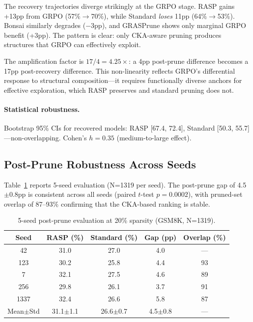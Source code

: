 \documentclass[11pt,a4paper]{article}
\newcommand{\method}{RASP}
\begin{document}
The recovery trajectories diverge strikingly at the GRPO stage. \method{} gains +13pp from GRPO (57\%$\to$70\%), while Standard \emph{loses} 11pp (64\%$\to$53\%). Bonsai similarly degrades ($-$3pp), and GRASPrune shows only marginal GRPO benefit (+3pp). The pattern is clear: only CKA-aware pruning produces structures that GRPO can effectively exploit.

The amplification factor is $17/4 = 4.25\times$: a 4pp post-prune difference becomes a 17pp post-recovery difference. This non-linearity reflects GRPO's differential response to structural composition---it requires functionally diverse anchors for effective exploration, which \method{} preserves and standard pruning does not.

\paragraph{Statistical robustness.} Bootstrap 95\% CIs for recovered models: \method{} [67.4, 72.4], Standard [50.3, 55.7]---non-overlapping. Cohen's $h = 0.35$ (medium-to-large effect).

\subsection{Post-Prune Robustness Across Seeds}
\label{sec:seeds}

Table~\ref{tab:seeds} reports 5-seed evaluation (N=1319 per seed). The post-prune gap of 4.5$\pm$0.8pp is consistent across all seeds (paired $t$-test $p = 0.0002$), with pruned-set overlap of 87--93\% confirming that the CKA-based ranking is stable.

\begin{table}[t]
\centering
\small
\caption{5-seed post-prune evaluation at 20\% sparsity (GSM8K, N=1319).}
\label{tab:seeds}
\begin{tabular}{ccccc}
\toprule
\textbf{Seed} & \textbf{\method{} (\%)} & \textbf{Standard (\%)} & \textbf{Gap (pp)} & \textbf{Overlap (\%)} \\
\midrule
42 & 31.0 & 27.0 & 4.0 & --- \\
123 & 30.2 & 25.8 & 4.4 & 93 \\
7 & 32.1 & 27.5 & 4.6 & 89 \\
256 & 29.8 & 26.1 & 3.7 & 91 \\
1337 & 32.4 & 26.6 & 5.8 & 87 \\
\midrule
Mean$\pm$Std & 31.1$\pm$1.1 & 26.6$\pm$0.7 & 4.5$\pm$0.8 & --- \\
\bottomrule
\end{tabular}
\end{table}
\end{document}
